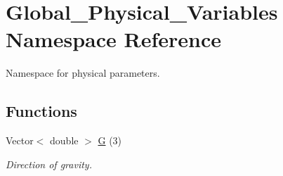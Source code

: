 \hypertarget{namespaceGlobal__Physical__Variables}{}\section{Global\+\_\+\+Physical\+\_\+\+Variables Namespace Reference}
\label{namespaceGlobal__Physical__Variables}


Namespace for physical parameters.  


\subsection*{Functions}
\begin{DoxyCompactItemize}
\item 
Vector$<$ double $>$ \hyperlink{namespaceGlobal__Physical__Variables_af5ae275cf339105b9a54821c034df470}{G} (3)
\begin{DoxyCompactList}\small\item\em Direction of gravity. \end{DoxyCompactList}\end{DoxyCompactItemize}
